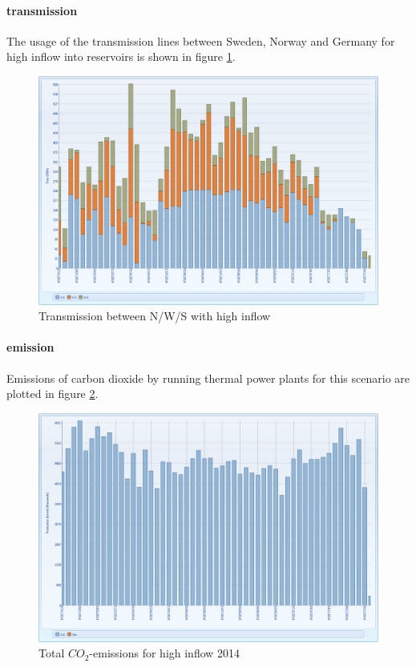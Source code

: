 \documentclass{article}
\begin{document}
\paragraph{transmission\\}
The usage of the transmission lines between Sweden, Norway and Germany for high inflow into reservoirs is shown in figure \ref{fig:MTnodetransmissionwet}.
\begin{figure}[htbp]
\begin{center}
\includegraphics[width=13cm,keepaspectratio=true]{figures/wetcase/MTnodetransmissionwet}
\caption{Transmission between N/W/S with high inflow}
\label{fig:MTnodetransmissionwet}
\end{center}
\end{figure}
\paragraph{emission\\}
Emissions of carbon dioxide by running thermal power plants for this scenario are plotted in figure \ref{fig:MTemissionswet}.
\begin{figure}[htbp]
\begin{center}
\includegraphics[width=13cm,keepaspectratio=true]{figures/wetcase/MTCO2wet}
\caption{Total $CO_2$-emissions for high inflow 2014}
\label{fig:MTemissionswet}
\end{center}
\end{figure}
\end{document}
